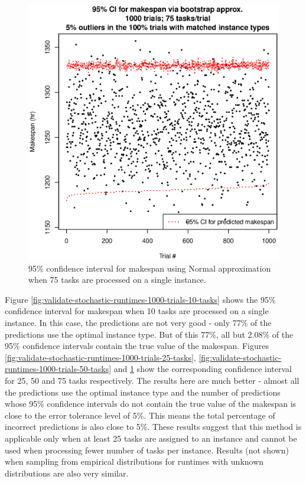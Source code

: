 \documentclass[12pt]{report}
\begin{document}
\begin{figure}
\includegraphics[width=1\textwidth]{validate-stochastic-runtimes-1000-trials-75-tasks.eps}
\caption{95\% confidence interval for makespan using Normal approximation when 75 tasks are processed on a single instance.}
\label{fig:validate-stochastic-runtimes-1000-trials-75-tasks}
\end{figure}

Figure \ref{fig:validate-stochastic-runtimes-1000-trials-10-tasks} shows the 95\% confidence interval for makespan when 10 tasks are processed on a single instance. 
In this case, the predictions are not very good - only 77\% of the predictions use the optimal instance type.
But of this 77\%, all but 2.08\% of the 95\% confidence intervals contain the true value of the makespan.
Figures \ref{fig:validate-stochastic-runtimes-1000-trials-25-tasks}, \ref{fig:validate-stochastic-runtimes-1000-trials-50-tasks} and \ref{fig:validate-stochastic-runtimes-1000-trials-75-tasks} show the corresponding confidence interval for 25, 50 and 75 tasks respectively. 
The results here are much better - almost all the predictions use the optimal instance type and the number of predictions whose 95\% confidence intervals do not contain the true value of the makespan is close to the error tolerance level of 5\%.
This means the total percentage of incorrect predictions is also close to 5\%.
These results suggest that this method is applicable only when at least 25 tasks are assigned to an instance and cannot be used when processing fewer number of tasks per instance.
Results (not shown) when sampling from empirical distributions for runtimes with unknown distributions are also very similar.
\end{document}
